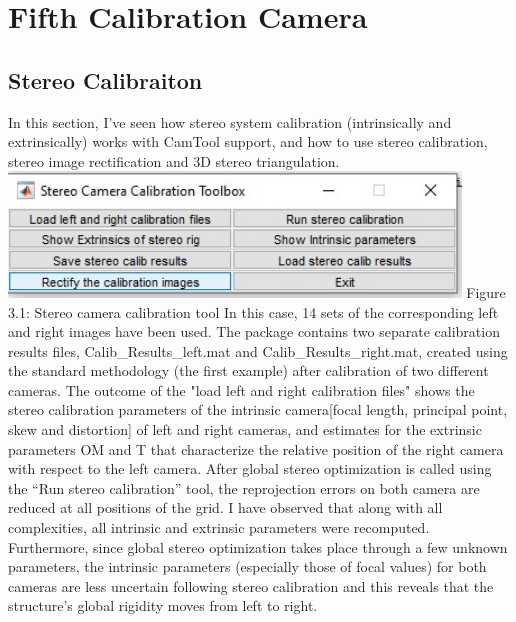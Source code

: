 \documentclass[a4paper, 12pt]{report}
\begin{document}
\section{Fifth Calibration Camera}
\subsection{Stereo Calibraiton}

In this section, I've seen how stereo system calibration (intrinsically and extrinsically) works with CamTool support, and how to use stereo calibration, stereo image rectification and 3D stereo triangulation.\newline
\includegraphics[width=0.9\textwidth]{resources/image/17.jpg} \newline
Figure 3.1: Stereo camera calibration tool \newline \newline 
In this case, 14 sets of the corresponding left and right images have been used. The package contains two separate calibration results files, Calib\_Results\_left.mat and Calib\_Results\_right.mat, created using the standard methodology (the first example) after calibration of two different cameras. \newline 
The outcome of the "load left and right calibration files" shows the stereo calibration parameters of the intrinsic camera[focal length, principal point, skew and distortion] of left and right cameras, and estimates for the extrinsic parameters OM and T that characterize the relative position of the right camera with respect to the left camera. \newline 
After global stereo optimization is called using the “Run stereo calibration” tool, the reprojection errors on both camera are reduced at all positions of the grid. I have observed that along with all complexities, all intrinsic and extrinsic parameters were recomputed. Furthermore, since global stereo optimization takes place through a few unknown parameters, the intrinsic parameters (especially those of focal values) for both cameras are less uncertain following stereo calibration and this reveals that the structure's global rigidity moves from left to right. \newline \newline
\end{document}
